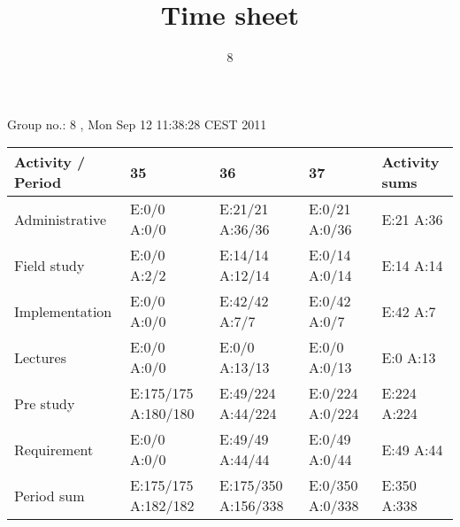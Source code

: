 \documentclass[a4paper]{article}
\title{Time sheet}
\author{8}
\begin{document}
\begin{landscape}
\begin{center}
	Group no.: 8
	, Mon Sep 12 11:38:28 CEST 2011

	\begin{tabular}{| l | l | l | l | l |}
		\hline
		Activity / Period & 35 & 36 & 37 & Activity sums \\
		\hline \hline
		
Administrative & E:0/0 A:0/0 & E:21/21 A:36/36 & E:0/21 A:0/36 & E:21 A:36 \\
Field study & E:0/0 A:2/2 & E:14/14 A:12/14 & E:0/14 A:0/14 & E:14 A:14 \\
Implementation & E:0/0 A:0/0 & E:42/42 A:7/7 & E:0/42 A:0/7 & E:42 A:7 \\
Lectures & E:0/0 A:0/0 & E:0/0 A:13/13 & E:0/0 A:0/13 & E:0 A:13 \\
Pre study & E:175/175 A:180/180 & E:49/224 A:44/224 & E:0/224 A:0/224 & E:224 A:224 \\
Requirement & E:0/0 A:0/0 & E:49/49 A:44/44 & E:0/49 A:0/44 & E:49 A:44 \\
Period sum & E:175/175 A:182/182 & E:175/350 A:156/338 & E:0/350 A:0/338 & E:350 A:338 \\
		\hline
	\end{tabular}
\end{center}
\end{landscape}
\end{document}
